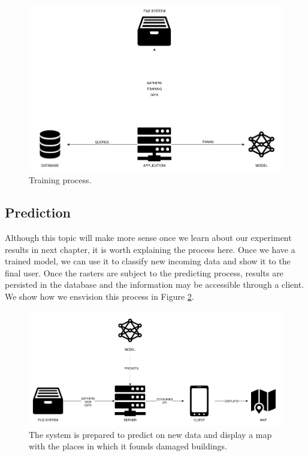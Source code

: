 \begin{figure}[!h]
  \centering
  \includegraphics[width=1\textwidth]{images/train-diagram.png}
  \caption{Training process.}
  \label{fig:train}
\end{figure}

\subsection{Prediction}

Although this topic will make more sense once we learn about our experiment results in next chapter, it is worth explaining the process here. Once we have a trained model, we can use it to classify new incoming data and show it to the final user. Once the rasters are subject to the predicting process, results are persisted in the database and the information may be accessible through a client. We show how we ensvision this process in Figure \ref{fig:predict}.\\

\begin{figure}[h]
  \centering
  \includegraphics[width=1\textwidth]{images/predict-diagram.png}
  \caption{The system is prepared to predict on new data and display a map with the places in which it founds damaged buildings.}
  \label{fig:predict}
\end{figure}

